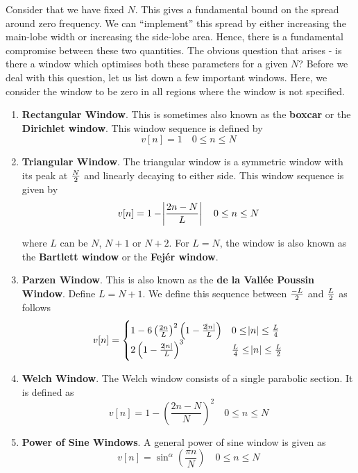 \documentclass{article}
\theoremstyle{definition}
\newcommand\ddfrac[2]{\frac{\displaystyle #1}{\displaystyle #2}}
\begin{document}
Consider that we have fixed $N$. This gives a fundamental bound on the spread around zero frequency. We can ``implement'' this spread by either increasing the main-lobe width or increasing the side-lobe area. Hence, there is a fundamental compromise between these two quantities. The obvious question that arises - is there a window which optimises both these parameters for a given $N$? Before we deal with this question, let us list down a few important windows. Here, we consider the window to be zero in all regions where the window is not specified.

\begin{enumerate}
    \item \textbf{Rectangular Window}. This is sometimes also known as the \textbf{boxcar} or the \textbf{Dirichlet window}. This window sequence is defined by 
    \[
        v[n] = 1 \quad 0 \leq n \leq N 
    \]
    
    \item \textbf{Triangular Window}. The triangular window is a symmetric window with its peak at $N \over 2$ and linearly decaying to either side. This window sequence is given by 
    \[
        v[n] =  1 - \abs{\frac{2n - N}{L}} \quad 0 \leq n \leq N 
    \]
    
    where $L$ can be $N$, $N+1$ or $N+2$. For $L=N$, the window is also known as the \textbf{Bartlett window} or the \textbf{Fejér window}.
    
    \item \textbf{Parzen Window}. This is also known as the \textbf{de la Vallée Poussin Window}. Define $L = N+1$. We define this sequence between $-L \over 2$ and $L \over 2$ as follows
    \[
        v[n] = 
        \begin{cases}
        1 - 6 \left( \frac{2n}{L} \right)^2 \left( 1 - \frac{2 \abs{n}}{L} \right) & 0 \leq \abs{n} \leq \frac{L}{4} \\
        2\left( 1 - \frac{2 \abs{n}}{L} \right)^3 & \frac{L}{4} \leq \abs{n} \leq \frac{L}{2}
        \end{cases}
    \]
    
    \item \textbf{Welch Window}. The Welch window consists of a single parabolic section. It is defined as 
    \[
        v[n] = 1 - \left( \frac{2n - N}{N} \right)^2 \quad 0 \leq n \leq N 
    \]
    
    \item \textbf{Power of Sine Windows}. A general power of sine window is given as 
    \[
        v[n] = \sin^\alpha \left( \ddfrac{\pi n}{N} \right) \quad 0 \leq n \leq N 
    \]
    

\end{enumerate}
\end{document}
